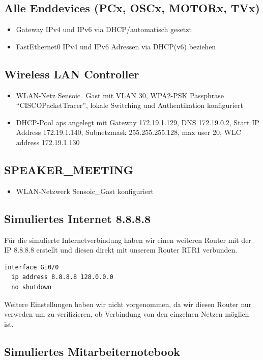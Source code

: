 \documentclass[11pt]{article}
\begin{document}
\subsection{Alle Enddevices (PCx, OSCx, MOTORx, TVx)}
\label{sec:orgdb1535a}
\begin{itemize}
\item Gateway IPv4 und IPv6 via DHCP/automatisch gesetzt
\item FastEthernet0 IPv4 und IPv6 Adressen via DHCP(v6) beziehen
\end{itemize}
\subsection{Wireless LAN Controller}
\label{sec:orgb83ff68}
\begin{itemize}
\item WLAN-Netz Sensoic\_Gast mit VLAN 30, WPA2-PSK Passphrase ``CISCOPacketTracer'', lokale Switching und Authentikation konfiguriert
\item DHCP-Pool aps angelegt mit Gateway 172.19.1.129, DNS 172.19.0.2, Start IP Address 172.19.1.140, Subnetzmask 255.255.255.128, max user 20, WLC address 172.19.1.130
\end{itemize}
\subsection{SPEAKER\_MEETING}
\label{sec:orgc8a8f3a}
\begin{itemize}
\item WLAN-Netzwerk Sensoic\_Gast konfiguriert
\end{itemize}
\subsection{Simuliertes Internet 8.8.8.8}
\label{sec:org814f7fe}

Für die simulierte Internetverbindung haben wir einen weiteren Router mit der IP 8.8.8.8 erstellt und diesen direkt mit unserem Router RTR1 verbunden.

\begin{verbatim}
interface Gi0/0
  ip address 8.8.8.8 128.0.0.0
  no shutdown
\end{verbatim}

Weitere Einstellungen haben wir nicht vorgenommen, da wir diesen Router nur verweden um zu verifizieren, ob Verbindung von den einzelnen Netzen möglich ist.
\subsection{Simuliertes Mitarbeiternotebook}
\label{sec:orge59964c}
\end{document}
